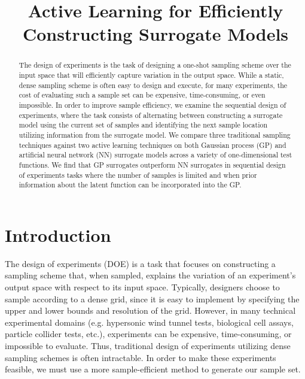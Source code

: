 \documentclass[conference]{IEEEtran}
\begin{document}
	
	
	\title{\LARGE \textbf{Active Learning for Efficiently Constructing Surrogate Models}}
	
	
	\author{
		} %
	
	
	\maketitle
	
	\begin{abstract}
		The design of experiments is the task of designing a one-shot sampling scheme over the input space that will efficiently capture variation in the output space. While a static, dense sampling scheme is often easy to design and execute, for many experiments, the cost of evaluating such a sample set can be expensive, time-consuming, or even impossible. In order to improve sample efficiency, we examine the sequential design of experiments, where the task consists of alternating between constructing a surrogate model using the current set of samples and identifying the next sample location utilizing information from the surrogate model. We compare three traditional sampling techniques against two active learning techniques on both Gaussian process (GP) and artificial neural network (NN) surrogate models across a variety of one-dimensional test functions. We find that GP surrogates outperform NN surrogates in sequential design of experiments tasks where the number of samples is limited and when prior information about the latent function can be incorporated into the GP.
	\end{abstract}
	
	\section{Introduction}
	\label{sec:introduction}
	
	The design of experiments (DOE) is a task that focuses on constructing a sampling scheme that, when sampled, explains the variation of an experiment's output space with respect to its input space. Typically, designers choose to sample according to a dense grid, since it is easy to implement by specifying the upper and lower bounds and resolution of the grid. However, in many technical experimental domains (e.g. hypersonic wind tunnel tests, biological cell assays, particle collider tests, etc.), experiments can be expensive, time-consuming, or impossible to evaluate. Thus, traditional design of experiments utilizing dense sampling schemes is often intractable. In order to make these experiments feasible, we must use a more sample-efficient method to generate our sample set. 
	
\end{document}
